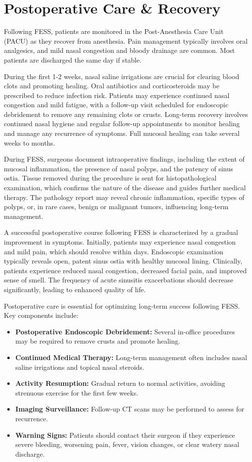 \section*{Postoperative Care \& Recovery}
Following FESS, patients are monitored in the Post-Anesthesia Care Unit (PACU) as they recover from anesthesia. Pain management typically involves oral analgesics, and mild nasal congestion and bloody drainage are common. Most patients are discharged the same day if stable.

During the first 1-2 weeks, nasal saline irrigations are crucial for clearing blood clots and promoting healing. Oral antibiotics and corticosteroids may be prescribed to reduce infection risk. Patients may experience continued nasal congestion and mild fatigue, with a follow-up visit scheduled for endoscopic debridement to remove any remaining clots or crusts. Long-term recovery involves continued nasal hygiene and regular follow-up appointments to monitor healing and manage any recurrence of symptoms. Full mucosal healing can take several weeks to months.

During FESS, surgeons document intraoperative findings, including the extent of mucosal inflammation, the presence of nasal polyps, and the patency of sinus ostia. Tissue removed during the procedure is sent for histopathological examination, which confirms the nature of the disease and guides further medical therapy. The pathology report may reveal chronic inflammation, specific types of polyps, or, in rare cases, benign or malignant tumors, influencing long-term management.

A successful postoperative course following FESS is characterized by a gradual improvement in symptoms. Initially, patients may experience nasal congestion and mild pain, which should resolve within days. Endoscopic examination typically reveals open, patent sinus ostia with healthy mucosal lining. Clinically, patients experience reduced nasal congestion, decreased facial pain, and improved sense of smell. The frequency of acute sinusitis exacerbations should decrease significantly, leading to enhanced quality of life.

Postoperative care is essential for optimizing long-term success following FESS. Key components include:

\begin{itemize}
  \item \textbf{Postoperative Endoscopic Debridement:} Several in-office procedures may be required to remove crusts and promote healing.
  \item \textbf{Continued Medical Therapy:} Long-term management often includes nasal saline irrigations and topical nasal steroids.
  \item \textbf{Activity Resumption:} Gradual return to normal activities, avoiding strenuous exercise for the first few weeks.
  \item \textbf{Imaging Surveillance:} Follow-up CT scans may be performed to assess for recurrence.
  \item \textbf{Warning Signs:} Patients should contact their surgeon if they experience severe bleeding, worsening pain, fever, vision changes, or clear watery nasal discharge.
\end{itemize}

